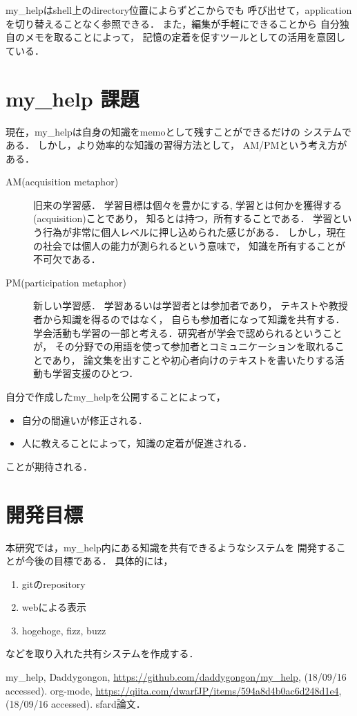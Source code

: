 \documentclass[a4j,twocolumn]{jsarticle}
\begin{document}
my\_helpはshell上のdirectory位置によらずどこからでも
呼び出せて，applicationを切り替えることなく参照できる．
また，編集が手軽にできることから
自分独自のメモを取ることによって，
記憶の定着を促すツールとしての活用を意図している．

\section{my\_help 課題}
\label{sec-3}
現在，my\_helpは自身の知識をmemoとして残すことができるだけの
システムである．
しかし，より効率的な知識の習得方法として，
AM/PMという考え方がある\cite{sfard}．

\begin{description}
\item[AM(acquisition metaphor)] 旧来の学習感．
学習目標は個々を豊かにする, 学習とは何かを獲得する(acquisition)ことであり，
知るとは持つ，所有することである．
学習という行為が非常に個人レベルに押し込められた感じがある．
しかし，現在の社会では個人の能力が測られるという意味で，
知識を所有することが不可欠である．
\item[PM(participation metaphor)] 新しい学習感．
学習あるいは学習者とは参加者であり，
テキストや教授者から知識を得るのではなく，
自らも参加者になって知識を共有する．
学会活動も学習の一部と考える．研究者が学会で認められるということが，
その分野での用語を使って参加者とコミュニケーションを取れることであり，
論文集を出すことや初心者向けのテキストを書いたりする活動も学習支援のひとつ．
\end{description}

自分で作成したmy\_helpを公開することによって，
\begin{itemize}
\item 自分の間違いが修正される．
\item 人に教えることによって，知識の定着が促進される．
\end{itemize}
ことが期待される．

\section{開発目標}
本研究では，my\_help内にある知識を共有できるようなシステムを
開発することが今後の目標である．
具体的には，
\begin{enumerate}
\item gitのrepository
\item webによる表示
\item hogehoge, fizz, buzz
\end{enumerate}
などを取り入れた共有システムを作成する．

{\small\setlength\baselineskip{10pt}	%
\begin{thebibliography}{9}
 my\_help, Daddygongon, \url{https://github.com/daddygongon/my_help}, (18/09/16 accessed).
 org-mode, \url{https://qiita.com/dwarfJP/items/594a8d4b0ac6d248d1e4}, (18/09/16 accessed).
 sfard論文．
\end{thebibliography}
}
\end{document}
